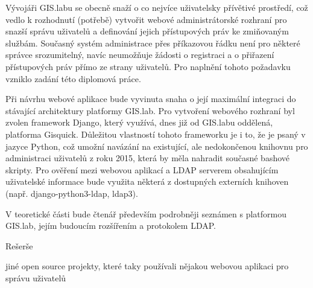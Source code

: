 
Vývojáři GIS.labu se obecně snaží o co nejvíce uživatelsky přívětivé
prostředí, což vedlo k rozhodnutí (potřebě) vytvořit webové
administrátorské rozhraní pro snazší správu uživatelů a definování
jejich přístupových práv ke zmiňovaným službám. Současný systém
administrace přes příkazovou řádku není pro některé správce
srozumitelný, navíc neumožňuje žádosti o registraci a o přiřazení
přístupových práv přímo ze strany uživatelů. Pro naplnění tohoto
požadavku vzniklo zadání této diplomová práce.

Při návrhu webové aplikace bude vyvinuta snaha o její maximální
integraci do stávající architektury platformy GIS.lab. Pro vytvoření
webového rozhraní byl zvolen framework Django, který využívá, dnes již
od GIS.labu oddělená, platforma Gisquick. Důležitou vlastností tohoto
frameworku je i to, že je psaný v jazyce Python, což umožní navázání
na existující, ale nedokončenou knihovnu pro administraci uživatelů z
roku 2015, která by měla nahradit současné bashové skripty. Pro
ověření mezi webovou aplikací a LDAP serverem obsahujícím uživatelské
informace bude využita některá z dostupných externích knihoven
(např. django-python3-ldap, ldap3).

V teoretické části bude čtenář především podrobněji seznámen s
platformou GIS.lab, jejím budoucím rozšířením a protokolem LDAP.

Rešerše

jiné open source projekty, které taky používali nějakou webovou aplikaci pro správu uživatelů
